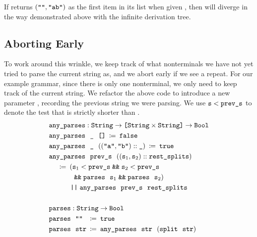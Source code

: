     If  returns $(\texttt{"}\texttt{}\texttt{"}, \texttt{"}\texttt{ab}\texttt{"})$ as the first item in its list when given , then  will diverge in the way demonstrated above with the infinite derivation tree.

  \subsection{Aborting Early} \label{sec:solve-nontermination}

    To work around this wrinkle, we keep track of what nonterminals we have not yet tried to parse the current string as, and we abort early if we see a repeat.  %
    For our example grammar, since there is only one nonterminal, we only need to keep track of the current string.  We refactor the above code to introduce a new parameter , recording the previous string we were parsing.  We use $\texttt{s} < \texttt{prev\_s}$ to denote the test that  is strictly shorter than . \label{sec:valid-param-parser}
    \begin{align*}
      & \fname{any\_parses} \oftypesep \String \typeto \typelistp{\typeprod{\String}{\String}} \typeto \Bool \\
      & \fname{any\_parses}~~\termhole~~\nil \functiondefeq \false \\
      & \fname{any\_parses}~~\termhole~~(\cons{(\str{a}, \str{b})}{\termhole}) \functiondefeq \true \\
      & \fname{any\_parses}~~\farg{prev\_s}~~(\cons{(\farg{s$_1$}, \farg{s$_2$})}{\farg{rest\_splits}}) \\
      & \quad \functiondefeq \left( \farg{s$_1$} < \farg{prev\_s} \booland \farg{s$_2$} < \farg{prev\_s} \right. \\
      & \phantom{\quad \functiondefeq \left(\right.} \left.\booland \fname{parses}~~\farg{s$_1$} \booland \fname{parses}~~\farg{s$_2$}\right) \\
      & \phantom{\quad \functiondefeq {}} \boolor \fname{any\_parses}~~\farg{prev\_s}~~\farg{rest\_splits} \\
      \\
      & \fname{parses} \oftypesep \String \typeto \Bool \\
      & \fname{parses}~~\aswidthof{\str{}}{\farg{str}} \functiondefeq \true \\
      & \fname{parses}~~\farg{str} \functiondefeq \fname{any\_parses}~~\farg{str}~~(\fname{split}~~\farg{str})
    \end{align*}

